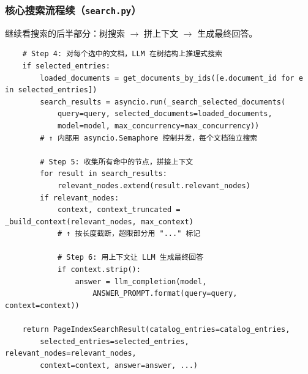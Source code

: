 \documentclass[presentation,aspectratio=169]{ctexbeamer}
\begin{document}
\begin{frame}[fragile]
\frametitle{核心搜索流程续（\texttt{search.py}）}
{\scriptsize 继续看搜索的后半部分：树搜索 $\rightarrow$ 拼上下文 $\rightarrow$ 生成最终回答。}

\vspace{0.05cm}
{\tiny
\begin{verbatim}
    # Step 4: 对每个选中的文档，LLM 在树结构上推理式搜索
    if selected_entries:
        loaded_documents = get_documents_by_ids([e.document_id for e in selected_entries])
        search_results = asyncio.run(_search_selected_documents(
            query=query, selected_documents=loaded_documents,
            model=model, max_concurrency=max_concurrency))
        # ↑ 内部用 asyncio.Semaphore 控制并发，每个文档独立搜索

        # Step 5: 收集所有命中的节点，拼接上下文
        for result in search_results:
            relevant_nodes.extend(result.relevant_nodes)
        if relevant_nodes:
            context, context_truncated = _build_context(relevant_nodes, max_context)
            # ↑ 按长度截断，超限部分用 "..." 标记

            # Step 6: 用上下文让 LLM 生成最终回答
            if context.strip():
                answer = llm_completion(model,
                    ANSWER_PROMPT.format(query=query, context=context))

    return PageIndexSearchResult(catalog_entries=catalog_entries,
        selected_entries=selected_entries, relevant_nodes=relevant_nodes,
        context=context, answer=answer, ...)
\end{verbatim}}
\end{frame}

\end{document}
